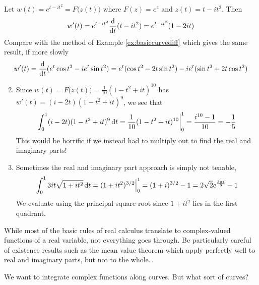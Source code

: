 \begin{examples}{}{}
	\exstart Let $w(t)=e^{t-it^2}=F\bigl(z(t)\bigr)$ where $F(z)=e^z$ and $z(t)=t-it^2$. Then
	\[
		w'(t) =e^{t-it^2}\frac{\mathrm{d} }{\mathrm{d} t}(t-it^2) =e^{t-it^2}(1-2it)
	\]
	Compare with the method of Example \ref{ex:basiccurvediff} which gives the same result, if more slowly
	\[
		w'(t) =\frac{\mathrm{d} }{\mathrm{d} t}(e^t\cos t^2-ie^t\sin t^2) =e^t(\cos t^2-2t\sin t^2)-ie^t(\sin t^2+2t\cos t^2)
	\]
	\begin{enumerate}\setcounter{enumi}{1}
		\item Since $w(t)=F\bigl(z(t)\bigr) =\frac 1{10}(1-t^2+it)^{10}$ has $w'(t)=(i-2t)(1-t^2+it)^9$, we see that
		\[
			\int_0^1(i-2t)(1-t^2+it)^9\,{\mathrm{d} t} =\frac 1{10}(1-t^2+it)^{10}\bigg|_0^1 =\frac{i^{10}-1}{10} =-\frac 15
		\]
		This would be horrific if we instead had to multiply out to find the real and imaginary parts!
		\item Sometimes the real and imaginary part approach is simply not tenable,
		\[
			\int_0^1 3it\sqrt{1+it^2}\,{\mathrm{d} t} =(1+it^2)^{3/2}\Big|_0^1 =(1+i)^{3/2}-1 =2\sqrt 2e^{\frac{3\pi i}{8}}-1
		\]
		We evaluate using the principal square root since $1+it^2$ lies in the first quadrant.
	\end{enumerate}
\end{examples}
\goodbreak

While most of the basic rules of real calculus translate to complex-valued functions of a real variable, not everything goes through. Be particularly careful of existence results such as the mean value theorem which apply perfectly well to real and imaginary parts, but not to the whole\ldots
\goodbreak



We want to integrate complex functions along curves. But what sort of curves?

